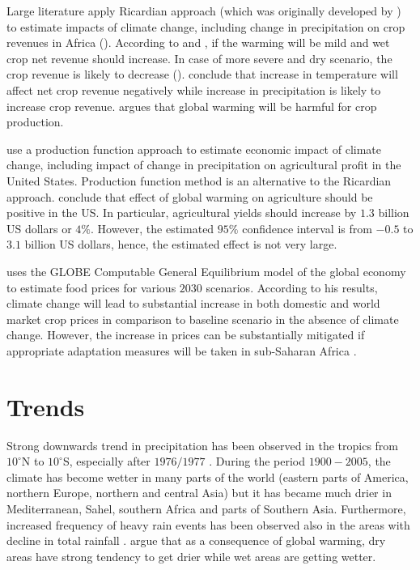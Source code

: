 \documentclass[a4paper,12pt]{article}
\begin{document}
Large literature apply Ricardian approach (which was originally developed by \citealp{Mendelsohn94}) to estimate impacts of climate change, including change in precipitation on crop revenues in Africa (\citealp{RicardianBello,kabubo2007, KMendelsohn2008, SeoMendelsohn}). According to \cite{SeoMendelsohn} and \cite{KMendelsohn2008}, if the warming will be mild and wet crop net revenue should increase. In case of more severe and dry scenario, the crop revenue is likely to decrease (\citealp{KMendelsohn2008, SeoMendelsohn}).  \cite{RicardianBello} conclude that increase in temperature will affect net crop revenue negatively while increase in precipitation is likely to increase crop revenue. \citet{kabubo2007} argues that global warming will be harmful for crop production.

\cite{Deschenes2007Ric} use a production function approach to estimate economic impact of climate change, including impact of change in precipitation on agricultural profit in the United States. Production function method is an alternative to the Ricardian approach. \cite{Deschenes2007Ric} conclude that effect of global warming on agriculture should be positive in the US. In particular, agricultural yields should increase by $1.3$ billion US dollars or $4\%$. However, the estimated $95\%$ confidence interval is from $-0.5$ to $3.1$ billion US dollars, hence, the estimated effect is not very large.

\cite{OxfamIDS} uses the GLOBE Computable General Equilibrium model of the global economy to estimate food prices for various $2030$ scenarios. According to his results, climate change will lead to substantial increase in both domestic and world market crop prices in comparison to baseline scenario in the absence of climate change. However, the increase in prices can be substantially mitigated if appropriate adaptation measures will be taken in sub-Saharan Africa \citep{OxfamIDS}.

\section*{Trends}

 Strong downwards trend in precipitation has been observed in the tropics from $10^\circ$N to $10^\circ$S, especially after $1976/1977$ \citep{IPCCtrenberth}. During the period $1900-2005$, the climate has become wetter in many parts of the world (eastern parts of America, northern Europe, northern and central Asia) but it has became much drier in Mediterranean, Sahel, southern Africa and parts of Southern Asia. Furthermore, increased frequency of heavy rain events has been observed also in the areas with decline in total rainfall \citep{IPCCtrenberth}. \cite{Trenberth2014} argue that as a consequence of global warming, dry areas have strong tendency to get drier while wet areas are getting wetter. 
 


\end{document}
